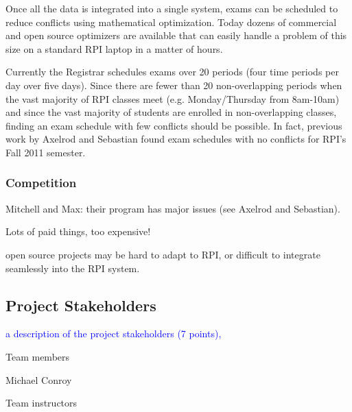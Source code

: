 \documentclass[11pt]{article}
\begin{document}
Once all the data is integrated into a single system, exams can be scheduled to reduce conflicts using mathematical optimization. Today dozens of commercial and open source optimizers are available that can easily handle a problem of this size on a standard RPI laptop in a matter of hours.  

Currently the Registrar schedules exams over 20 periods (four time periods per day over five days).  Since there are fewer than 20 non-overlapping periods when the vast majority of RPI classes meet (e.g. Monday/Thursday from 8am-10am) and since the vast majority of students are enrolled in non-overlapping classes, finding an exam schedule with few conflicts should be possible.  In fact, previous work by Axelrod and Sebastian found exam schedules with no conflicts for RPI's Fall 2011 semester.

\subsubsection{Competition}

Mitchell and Max: their program has major issues (see Axelrod and Sebastian).

Lots of paid things, too expensive!

open source projects may be hard to adapt to RPI, or difficult to integrate seamlessly into the RPI system.



\subsection{Project Stakeholders} %
\textcolor{blue}{a description of the project stakeholders (7 points),}

Team members

Michael Conroy

Team instructors

\end{document}
